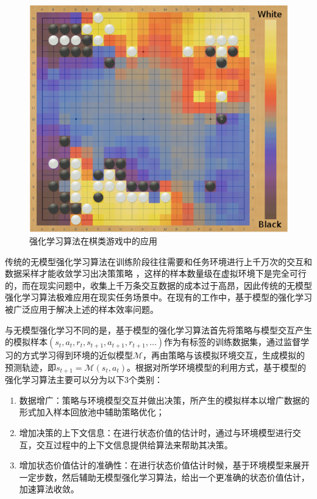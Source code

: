 \begin{figure}
  \centering
  \includegraphics[width=\linewidth]{figures/rl-go.png}
  \caption{强化学习算法在棋类游戏中的应用}
  \label{fig:rl-go}
\end{figure}


传统的无模型强化学习算法在训练阶段往往需要和任务环境进行上千万次的交互和数据采样才能收敛学习出决策策略 \cite{degris2012model}，这样的样本数量级在虚拟环境下是完全可行的，而在现实问题中，收集上千万条交互数据的成本过于高昂，因此传统的无模型强化学习算法极难应用在现实任务场景中。在现有的工作中，基于模型的强化学习被广泛应用于解决上述的样本效率问题\cite{osband2014model,moerland2020model}。

与无模型强化学习不同的是，基于模型的强化学习算法首先将策略与模型交互产生的模拟样本$(s_t,a_t,r_t,s_{t+1},a_{t+1},r_{t+1},\ldots)$作为有标签的训练数据集，通过监督学习的方式学习得到环境的近似模型$\mathcal{M}$，再由策略与该模拟环境交互，生成模拟的预测轨迹，即$s_{t+1}=\mathcal{M}(s_t,a_t)$。根据对所学环境模型的利用方式，基于模型的强化学习算法主要可以分为以下3个类别\cite{pal2020brief}：

\begin{enumerate}[1）]
    \item 数据增广：策略与环境模型交互并做出决策，所产生的模拟样本以增广数据的形式加入样本回放池中辅助策略优化；
    \item 增加决策的上下文信息：在进行状态价值的估计时，通过与环境模型进行交互，交互过程中的上下文信息提供给算法来帮助其决策。
    \item 增加状态价值估计的准确性：在进行状态价值估计时候，基于环境模型来展开一定步数，然后辅助无模型强化学习算法，给出一个更准确的状态价值估计，加速算法收敛。
\end{enumerate}

